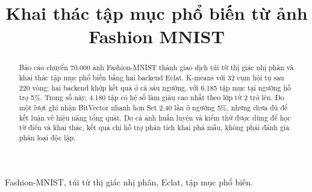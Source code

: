 \documentclass[conference]{IEEEtran}
\begin{document}

\title{Khai thác tập mục phổ biến từ ảnh Fashion MNIST}

\author{}

\maketitle

\begin{abstract}
Báo cáo chuyển 70.000 ảnh Fashion-MNIST thành giao dịch túi từ thị giác nhị phân và khai thác tập mục phổ biến bằng hai backend Eclat. K-means với 32 cụm hội tụ sau 220 vòng; hai backend khớp kết quả ở cả sáu ngưỡng, với 6.185 tập mục tại ngưỡng hỗ trợ 5\%. Trong số này, 4.180 tập có hệ số làm giàu cao nhất theo lớp từ 2 trở lên. Đo một lượt ghi nhận BitVector nhanh hơn Set 2,40 lần ở ngưỡng 5\%, nhưng chưa đủ để kết luận về hiệu năng tổng quát. Do cả ảnh huấn luyện và kiểm thử được dùng để học từ điển và khai thác, kết quả chỉ hỗ trợ phân tích khai phá mẫu, không phải đánh giá phân loại độc lập.
\end{abstract}

\begin{IEEEkeywords}
Fashion-MNIST, túi từ thị giác nhị phân, Eclat, tập mục phổ biến.
\end{IEEEkeywords}






\end{document}
